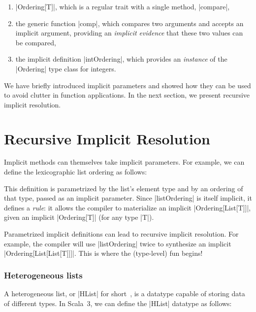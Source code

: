 \begin{enumerate}
  \item |Ordering[T]|, which is a regular trait with a single method, |compare|,
  \item the generic function |comp|, which compares two arguments and accepts an implicit argument, providing an \emph{implicit evidence} that these two values can be compared,
  \item the implicit definition |intOrdering|, which provides an \emph{instance} of the |Ordering| type class for integers.
\end{enumerate}

\ordExample

We have briefly introduced implicit parameters and showed how they can be used to avoid clutter in function applications.
In the next section, we present recursive implicit resolution.

\section{Recursive Implicit Resolution}
\label{sec:recursive-implicit-resolution}

Implicit methods can themselves take implicit parameters.
For example, we can define the lexicographic list ordering as follows:

\ordListExample

\noindent
This definition is parametrized by the list's element type and by an ordering of that type, passed as an implicit parameter.
Since |listOrdering| is itself implicit, it defines a \emph{rule}: it allows the compiler to materialize an implicit |Ordering[List[T]]|, given an implicit |Ordering[T]| (for any type |T|).

Parametrized implicit definitions can lead to recursive implicit resolution. For example, the compiler will use |listOrdering| twice to synthesize an implicit |Ordering[List[List[T]]]|.
This is where the (type-level) fun begins!

\subsubsection{Heterogeneous lists}

A heterogeneous list, or |HList| for short~\citep{kiselyov2004strongly}, is a datatype capable of storing data of different types.
In Scala~3, we can define the |HList| datatype as follows:

\hlistEnumDefinition

